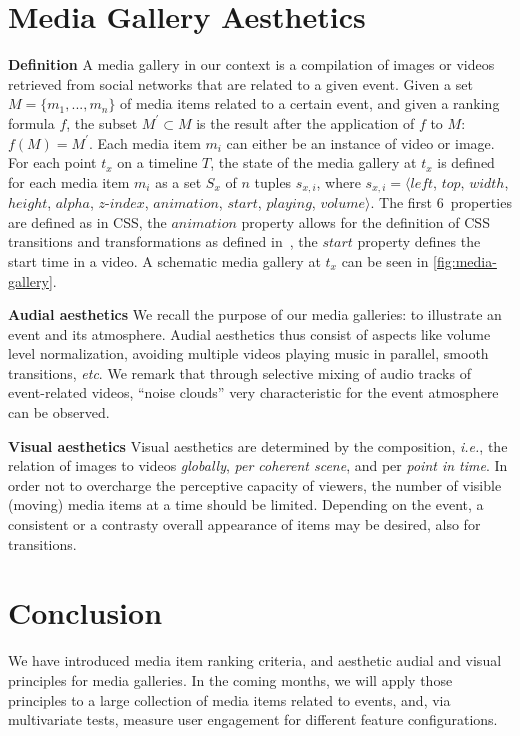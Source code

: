 \section{Media Gallery Aesthetics}

\noindent \textbf{Definition}
A media gallery in our context is a compilation of images or videos
retrieved from social networks that are related to a given event.
Given a set $M = \{m_1,..., m_n\}$ of media items related to a certain event,
and given a ranking formula $f$,
the subset $M^\prime \subset M$
is the result after the application of $f$ to $M$: $f(M)=M^\prime$.
Each media item $m_i$ can either be an instance of video or image.
For each point $t_x$ on a timeline $T$, the state of the media gallery
at $t_x$ is defined for each media item $m_i$
as a set $S_x$ of $n$ tuples $s_{x,i}$, where
$s_{x,i}=\langle \mathit{left}$, $\mathit{top}$, $\mathit{width}$, $\mathit{height}$,
$\mathit{alpha}$, $\mathit{z\mbox{-}index}$, $\mathit{animation}$,
$\mathit{start}$, $\mathit{playing}$, $\mathit{volume} \rangle$.
The first 6~properties are defined as in CSS, the $\mathit{animation}$ property
allows for the definition of CSS transitions
and transformations as defined in~\cite{CSSTransitions2009,CSSTransforms2012},
the $\mathit{start}$ property defines the start time in a video.
A schematic media gallery at $t_x$ can be seen in \autoref{fig:media-gallery}.

\noindent \textbf{Audial aesthetics}
We recall the purpose of our media galleries:
to illustrate an event and its atmosphere.
Audial aesthetics thus consist of aspects like volume level normalization,
avoiding multiple videos playing music in parallel, smooth transitions, \emph{etc}.
We remark that through selective mixing of audio tracks
of event-related videos, ``noise clouds'' very characteristic
for the event atmosphere can be observed.

\noindent \textbf{Visual aesthetics}
Visual aesthetics are determined by the composition, \emph{i.e.},
the relation of images to videos \emph{globally}, \emph{per coherent scene},
and per \emph{point in time}.
In order not to overcharge the perceptive capacity
of viewers, the number of visible (moving) media items
at a time should be limited.
Depending on the event, a consistent or a contrasty overall
appearance of items may be desired, also for transitions.

\section{Conclusion}
We have introduced media item ranking criteria, and
aesthetic audial and visual principles for media galleries.
In the coming months, we will apply those principles
to a large collection of media items related to events,
and, via multivariate tests, measure user engagement
for different feature configurations.

